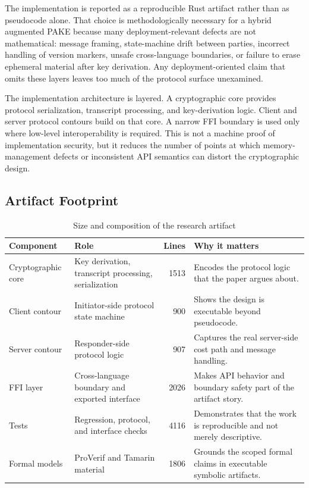 \documentclass[conference]{IEEEtran}
\begin{document}
The implementation is reported as a reproducible Rust artifact rather than as pseudocode alone. That choice is methodologically necessary for a hybrid augmented PAKE because many deployment-relevant defects are not mathematical: message framing, state-machine drift between parties, incorrect handling of version markers, unsafe cross-language boundaries, or failure to erase ephemeral material after key derivation. Any deployment-oriented claim that omits these layers leaves too much of the protocol surface unexamined.

The implementation architecture is layered. A cryptographic core provides protocol serialization, transcript processing, and key-derivation logic. Client and server protocol contours build on that core. A narrow FFI boundary is used only where low-level interoperability is required. This is not a machine proof of implementation security, but it reduces the number of points at which memory-management defects or inconsistent API semantics can distort the cryptographic design.

\subsection{Artifact Footprint}

\begin{table}[t]
\caption{Size and composition of the research artifact}
\label{tab:acit-codebase}
\centering
\footnotesize
\begin{tabularx}{\textwidth}{@{}L{3.2cm}L{3.0cm}rY@{}}
\toprule
Component & Role & Lines & Why it matters \\
\midrule
Cryptographic core & Key derivation, transcript processing, serialization & 1513 & Encodes the protocol logic that the paper argues about. \\
Client contour & Initiator-side protocol state machine & 900 & Shows the design is executable beyond pseudocode. \\
Server contour & Responder-side protocol logic & 907 & Captures the real server-side cost path and message handling. \\
FFI layer & Cross-language boundary and exported interface & 2026 & Makes API behavior and boundary safety part of the artifact story. \\
Tests & Regression, protocol, and interface checks & 4116 & Demonstrates that the work is reproducible and not merely descriptive. \\
Formal models & ProVerif and Tamarin material & 1806 & Grounds the scoped formal claims in executable symbolic artifacts. \\
\bottomrule
\end{tabularx}
\end{table}
\end{document}
